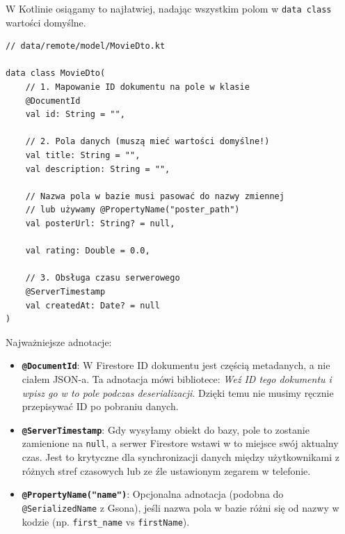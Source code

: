 W Kotlinie osiągamy to najłatwiej, nadając wszystkim polom w \texttt{data class} wartości domyślne.

\begin{verbatim}
// data/remote/model/MovieDto.kt

data class MovieDto(
    // 1. Mapowanie ID dokumentu na pole w klasie
    @DocumentId 
    val id: String = "",

    // 2. Pola danych (muszą mieć wartości domyślne!)
    val title: String = "",
    val description: String = "",
    
    // Nazwa pola w bazie musi pasować do nazwy zmiennej
    // lub używamy @PropertyName("poster_path")
    val posterUrl: String? = null,
    
    val rating: Double = 0.0,

    // 3. Obsługa czasu serwerowego
    @ServerTimestamp 
    val createdAt: Date? = null
)
\end{verbatim}

Najważniejsze adnotacje:

\begin{itemize}
    \item \textbf{\texttt{@DocumentId}}:
    W Firestore ID dokumentu jest częścią metadanych, a nie ciałem JSON-a. Ta adnotacja mówi bibliotece: \textit{Weź ID tego dokumentu i wpisz go w to pole podczas deserializacji}. Dzięki temu nie musimy ręcznie przepisywać ID po pobraniu danych.
    
    \item \textbf{\texttt{@ServerTimestamp}}:
    Gdy wysyłamy obiekt do bazy, pole to zostanie zamienione na \texttt{null}, a serwer Firestore wstawi w to miejsce swój aktualny czas. Jest to krytyczne dla synchronizacji danych między użytkownikami z różnych stref czasowych lub ze źle ustawionym zegarem w telefonie.
    
    \item \textbf{\texttt{@PropertyName("name")}}:
    Opcjonalna adnotacja (podobna do \texttt{@SerializedName} z Gsona), jeśli nazwa pola w bazie różni się od nazwy w kodzie (np. \texttt{first\_name} vs \texttt{firstName}).
\end{itemize}

